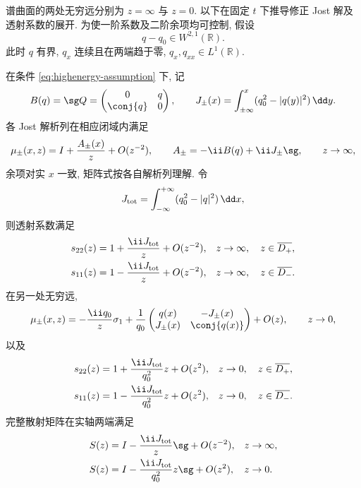 谱曲面的两处无穷远分别为 $z=\infty$ 与 $z=0$. 以下在固定 $t$ 下推导修正 Jost 解及透射系数的展开. 为使一阶系数及二阶余项均可控制, 假设
\begin{equation}\label{eq:highenergy-assumption}
q-q_0\in W^{2,1}(\mathbb R).
\end{equation}
此时 $q$ 有界, $q_x$ 连续且在两端趋于零, $q_x,q_{xx}\in L^1(\mathbb R)$.

\begin{proposition}[两处无穷远的渐近展开]\label{prop:highenergy}
在条件 \eqref{eq:highenergy-assumption} 下, 记
\begin{equation}\label{eq:asymptotic-coefficients}
B(q)=\sg Q=\begin{pmatrix}0&q\\\conj{q}&0\end{pmatrix},\qquad
J_\pm(x)=\int_{\pm\infty}^{x}(q_0^2-|q(y)|^2)\,\dd y.
\end{equation}
各 Jost 解析列在相应闭域内满足
\begin{equation}\label{eq:mu-highenergy}
\mu_\pm(x,z)=I+\dfrac{A_\pm(x)}{z}+O(z^{-2}),\qquad
A_\pm=-\ii B(q)+\ii J_\pm\sg,\qquad z\to\infty,
\end{equation}
余项对实 $x$ 一致, 矩阵式按各自解析列理解. 令
\[
J_{\rm tot}=\int_{-\infty}^{+\infty}(q_0^2-|q|^2)\,\dd x,
\]
则透射系数满足
\begin{equation}\label{eq:transmission-highenergy}
\begin{aligned}
s_{22}(z)&=1+\dfrac{\ii J_{\rm tot}}{z}+O(z^{-2}),&&z\to\infty,\quad z\in\overline{D_+},\\
s_{11}(z)&=1-\dfrac{\ii J_{\rm tot}}{z}+O(z^{-2}),&&z\to\infty,\quad z\in\overline{D_-}.
\end{aligned}
\end{equation}
在另一处无穷远,
\begin{equation}\label{eq:smallmu}
\mu_\pm(x,z)=-\dfrac{\ii q_0}{z}\sigma_1
+\dfrac{1}{q_0}\begin{pmatrix}q(x)&-J_\pm(x)\\J_\pm(x)&\conj{q(x)}\end{pmatrix}
+O(z),\qquad z\to0,
\end{equation}
以及
\begin{equation}\label{eq:transmission-smallenergy}
\begin{aligned}
s_{22}(z)&=1+\dfrac{\ii J_{\rm tot}}{q_0^2}z+O(z^2),&&z\to0,\quad z\in\overline{D_+},\\
s_{11}(z)&=1-\dfrac{\ii J_{\rm tot}}{q_0^2}z+O(z^2),&&z\to0,\quad z\in\overline{D_-}.
\end{aligned}
\end{equation}
完整散射矩阵在实轴两端满足
\begin{equation}\label{eq:scattering-two-infinities}
\begin{aligned}
S(z)&=I-\dfrac{\ii J_{\rm tot}}{z}\sg+O(z^{-2}),&&z\to\infty,\\
S(z)&=I-\dfrac{\ii J_{\rm tot}}{q_0^2}z\sg+O(z^2),&&z\to0.
\end{aligned}
\end{equation}
\end{proposition}
